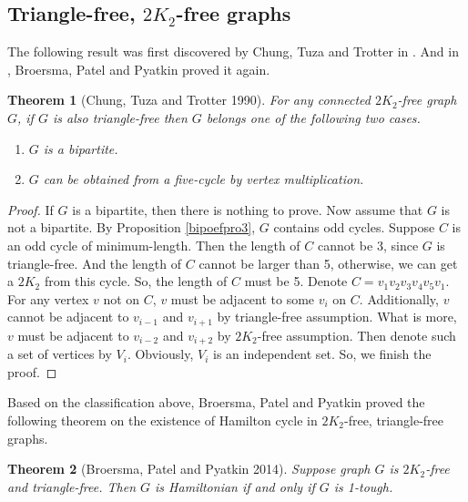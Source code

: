 \documentclass[12pt]{report}
\newtheorem{theorem}{Theorem}
\begin{document}
\subsection{Triangle-free, $2K_2$-free graphs}\label{sec511}
The following result was first discovered by Chung, Tuza and Trotter in \cite{chung1990maximum}. And in \cite{broersma2014toughness}, Broersma, Patel and Pyatkin proved it again. 

\begin{theorem}[Chung, Tuza and Trotter 1990]\label{thmkindtrf2k2}
For any connected $2K_2$-free graph $G$, if $G$ is also triangle-free then $G$ belongs one of the following two cases.
\begin{enumerate}
\item $G$ is a bipartite.
\item $G$ can be obtained from a five-cycle by vertex multiplication.
\end{enumerate}
\end{theorem}

\begin{proof}
If $G$ is a bipartite, then there is nothing to prove. Now assume that $G$ is not a bipartite. By Proposition \ref{bipoefpro3}, $G$ contains odd cycles. Suppose $C$ is an odd cycle of minimum-length. Then the length of $C$ cannot be 3, since $G$ is triangle-free. And the length of $C$ cannot be larger than 5, otherwise, we can get a $2K_2$ from this cycle. So, the length of $C$ must be 5. Denote $C=v_1v_2v_3v_4v_5v_1$. For any vertex $v$ not on $C$,  $v$ must be adjacent to some $v_i$ on $C$. Additionally, $v$ cannot be adjacent to $v_{i-1}$ and $v_{i+1}$ by triangle-free assumption. What is more, $v$ must be adjacent to $v_{i-2}$ and $v_{i+2}$ by $2K_2$-free assumption. Then denote such a set of vertices by $V_i$. Obviously, $V_i$ is an independent set. So, we finish the proof.
\end{proof}


Based on the classification above, Broersma, Patel and Pyatkin proved the following theorem on the existence of Hamilton cycle in $2K_2$-free, triangle-free graphs.
\begin{theorem}[Broersma, Patel and Pyatkin 2014]\label{2k2ftrif1th}
Suppose graph $G$ is $2K_2$-free and triangle-free. Then $G$ is Hamiltonian if and only if $G$ is 1-tough.
\end{theorem}
\end{document}
